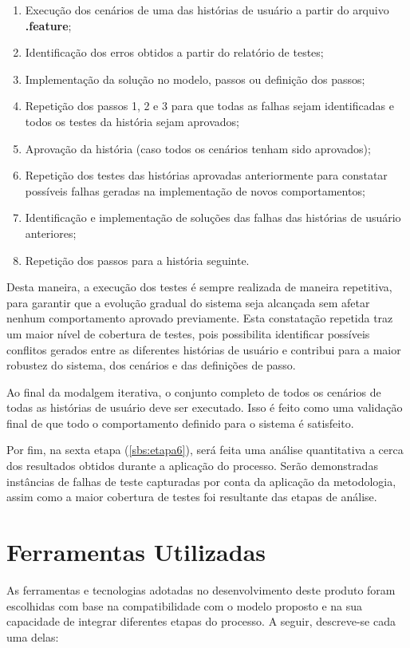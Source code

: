 \begin{enumerate}
    \item Execução dos cenários de uma das histórias de usuário a partir do arquivo \textbf{.feature};
    \item Identificação dos erros obtidos a partir do relatório de testes;
    \item Implementação da solução no modelo, passos ou definição dos passos;
    \item Repetição dos passos 1, 2 e 3 para que todas as falhas sejam identificadas e todos os testes da história sejam aprovados;
    \item Aprovação da história (caso todos os cenários tenham sido aprovados);
    \item Repetição dos testes das histórias aprovadas anteriormente para constatar possíveis falhas geradas na implementação de novos comportamentos;
    \item Identificação e implementação de soluções das falhas das histórias de usuário anteriores;
    \item Repetição dos passos para a história seguinte.
\end{enumerate}

Desta maneira, a execução dos testes é sempre realizada de maneira repetitiva, para garantir que a evolução gradual do sistema seja alcançada sem afetar 
nenhum comportamento aprovado previamente. Esta constatação repetida traz um maior nível de cobertura de testes, pois possibilita identificar possíveis 
conflitos gerados entre as diferentes histórias de usuário e contribui para a maior robustez do sistema, dos cenários e das definições de passo.

Ao final da modalgem iterativa, o conjunto completo de todos os cenários de todas as histórias de usuário deve ser executado. Isso é feito como uma 
validação final de que todo o comportamento definido para o sistema é satisfeito.

Por fim, na sexta etapa (\ref{sbs:etapa6}), será feita uma análise quantitativa a cerca dos resultados obtidos durante a aplicação do processo. Serão 
demonstradas instâncias de falhas de teste capturadas por conta da aplicação da metodologia, assim como a maior cobertura de testes foi resultante das 
etapas de análise.

\section{\textbf{Ferramentas Utilizadas}}
As ferramentas e tecnologias adotadas no desenvolvimento deste produto foram escolhidas com base na compatibilidade com o modelo proposto e na sua capacidade 
de integrar diferentes etapas do processo. A seguir, descreve-se cada uma delas:

